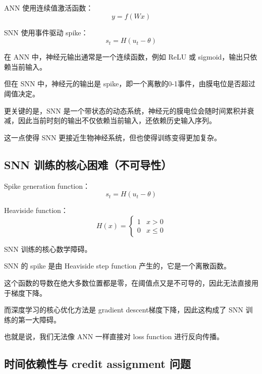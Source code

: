 \documentclass[journal,12pt,onecolumn]{IEEEtran}
\begin{document}
ANN 使用连续值激活函数：
  \[
    y = f(Wx)
  \]

SNN 使用事件驱动 spike：
  \[
    s_t = H(u_t - \theta)
  \]





在 ANN 中，神经元输出通常是一个连续函数，例如 ReLU 或 sigmoid，输出只依赖当前输入。

但在 SNN 中，神经元的输出是 spike，即一个离散的0-1事件，由膜电位是否超过阈值决定。

更关键的是，SNN 是一个带状态的动态系统，神经元的膜电位会随时间累积并衰减，因此当前时刻的输出不仅依赖当前输入，还依赖历史输入序列。

这一点使得 SNN 更接近生物神经系统，但也使得训练变得更加复杂。


\subsection{SNN 训练的核心困难（不可导性）}


Spike generation function：
  \[
    s_t = H(u_t - \theta)
  \]

Heaviside function：
  \[
    H(x) =
    \begin{cases}
    1 & x > 0 \\
    0 & x \le 0
    \end{cases}
  \]

SNN 训练的核心数学障碍。

SNN 的 spike 是由 Heaviside step function 产生的，它是一个离散函数。

这个函数的导数在绝大多数位置都是零，在阈值点又是不可导的，因此无法直接用于梯度下降。

而深度学习的核心优化方法是 gradient descent梯度下降，因此这构成了 SNN 训练的第一大障碍。

也就是说，我们无法像 ANN 一样直接对 loss function 进行反向传播。



\subsection{时间依赖性与 credit assignment 问题}
\end{document}
